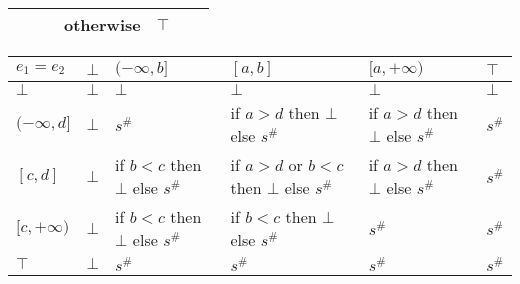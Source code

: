 \documentclass{article}
\begin{document}
\begin{landscape}
\begin{table}[]
{\begin{tabular}{|l|l|ll|ll|ll|ll|}
                                    &                         & \multicolumn{2}{l|}{}                                                  & otherwise                         & $\top$                                                                                            & \multicolumn{2}{l|}{}                                                  & \multicolumn{2}{l|}{}                                \\ \hline
    \end{tabular}}
    \end{table}






    \begin{table}
        \begin{tabular}{|l|l|l|l|l|l|}
        \hline
        $e_1 = e_2$    & $\bot$ & $(-\infty, b]$                     & $[a, b]$                                      & $[a, +\infty)$                     & $\top$ \\ \hline
        $\bot$         & $\bot$ & $\bot$                             & $\bot$                                        & $\bot$                             & $\bot$ \\ \hline
        $(-\infty, d]$ & $\bot$ & $s^\#$                             & if $a > d$ then $\bot$ else $s^\#$            & if $a > d$ then $\bot$ else $s^\#$ & $s^\#$ \\ \hline
        $[c, d]$       & $\bot$ & if $b < c$ then $\bot$ else $s^\#$ & if $a > d$ or $b < c$ then $\bot$ else $s^\#$ & if $a > d$ then $\bot$ else $s^\#$ & $s^\#$ \\ \hline
        $[c, +\infty)$ & $\bot$ & if $b < c$ then $\bot$ else $s^\#$ & if $b < c$ then $\bot$ else $s^\#$            & $s^\#$                             & $s^\#$ \\ \hline
        $\top$         & $\bot$ & $s^\#$                             & $s^\#$                                        & $s^\#$                             & $s^\#$ \\ \hline
        \end{tabular}
        \end{table}



\end{landscape}
\end{document}
